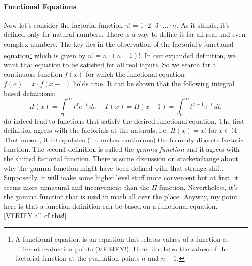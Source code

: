 \paragraph{Functional Equations}
Now let's consider the factorial function $n! = 1 \cdot 2 \cdot 3 \cdot \ldots \cdot n$. As it stands, it's defined only for natural numbers. There is a way to define it for all real and even complex numbers. The key lies in the observation of the factorial's functional equation\footnote{A functional equation is an equation that relates values of a function at different evaluation points (VERIFY!). Here, it relates the values of the factorial function at the evaluation points $n$ and $n-1$.} which is given by $n! = n \cdot (n-1)!$. In our expanded definition, we want that equation to be satisfied for all real inputs. So we search for a continuous function $f(x)$ for which the functional equation $f(x) = x \cdot f(x-1)$ holds true. It can be shown that the following integral based definitions:
\begin{equation}
\Pi(x)    = \int_0^\infty t^x e^{-t} \, dt, \quad
\Gamma(x) = \Pi(x-1) = \int_0^\infty t^{x-1} e^{-t} \, dt,
\end{equation}
do indeed lead to functions that satisfy the desired functional equation. The first definition agrees with the factorials at the naturals, i.e. $\Pi(x) = x!$ for $x \in \mathbb{N}$. That means, it interpolates (i.e. makes continuous) the formerly discrete factorial function. The second definition is called the \emph{gamma function} and it agrees with the shifted factorial function. There is some discussion on \href{https://math.stackexchange.com/questions/1362523/why-is-the-gamma-function-off-by-1-from-the-factorial}{stackexchange} about why the gamma function might have been defined with that strange shift. Supposedly, it will make some higher level stuff more convenient but at first, it seems more unnatural and inconvenient than the $\Pi$ function. Nevertheless, it's the gamma function that is used in math all over the place. Anyway, my point here is that a function definition can be based on a functional equation. 
[VERIFY all of this!]


